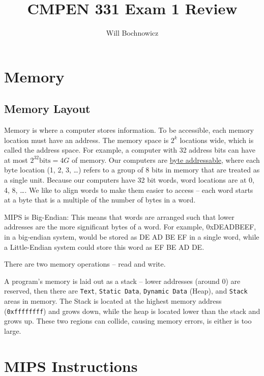 \documentclass{article}
\title{CMPEN 331 Exam 1 Review}
\author{Will Bochnowicz}
\begin{document}
\maketitle

\tableofcontents

\section{Memory}

\subsection{Memory Layout}

Memory is where a computer stores information. To be accessible, each memory location must have an address. The memory space is $2^k$ locations wide, which is called the address space. For example, a computer with 32 address bits can have at most $2^{32} \text{bits} = 4G$ of memory. Our computers are \underline{byte addressable}, where each byte location (1, 2, 3, \ldots) refers to a group of 8 bits in memory that are treated as a single unit. Because our computers have 32 bit words, word locations are at 0, 4, 8, \ldots. We like to align words to make them easier to access -- each word starts at a byte that is a multiple of the number of bytes in a word.

MIPS is Big-Endian: This means that words are arranged such that lower addresses are the more significant bytes of a word. For example, 0xDEADBEEF, in a big-endian system, would be stored as DE AD BE EF in a single word, while a Little-Endian system could store this word as EF BE AD DE.

There are two memory operations -- read and write. 

A program's memory is laid out as a stack -- lower addresses (around 0) are reserved, then there are \texttt{Text}, \texttt{Static Data}, \texttt{Dynamic Data} (Heap), and \texttt{Stack} areas in memory. The Stack is located at the highest memory address (\texttt{0xffffffff}) and grows down, while the heap is located lower than the stack and grows up. These two regions can collide, causing memory errors, is either is too large. 

\section{MIPS Instructions}
\end{document}
